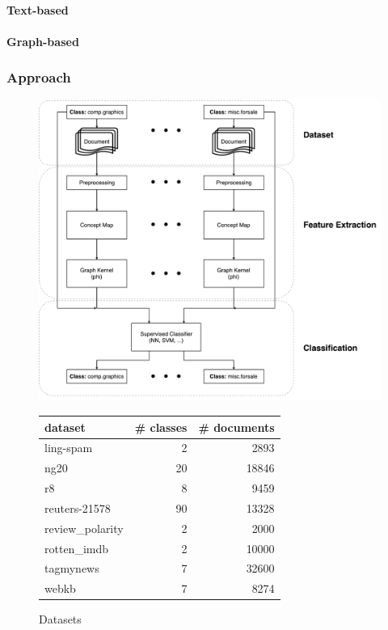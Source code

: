 \paragraph{Text-based}

\paragraph{Graph-based}
\todo{}

\subsubsection{Approach}

\begin{figure}[h]
\centering
\includegraphics[width=0.6\linewidth]{assets/figures/approach.pdf}
\caption{}
\end{figure}


\begin{figure}
\centering
\begin{tabular}{lrr}

dataset &  \# classes &  \# documents \\
\midrule
ling-spam       &  2 &  2893 \\
ng20            &  20 &  18846 \\
r8              &  8 &  9459 \\
reuters-21578   &  90 &  13328 \\
review\_polarity &  2 &  2000 \\
rotten\_imdb     &  2 &  10000 \\
tagmynews       &  7 &  32600 \\
webkb           &  7 &  8274 \\

\end{tabular}

\caption{Datasets}
\end{figure}

